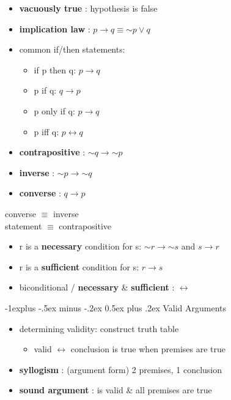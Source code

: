 \documentclass[10pt, landscape]{article}
\makeatletter
\renewcommand{\subsection}{\@startsection{subsection}{2}{0mm}%
                                {-1explus -.5ex minus -.2ex}%
                                {0.5ex plus .2ex}%
                                {\normalfont\normalsize\bfseries}}
\renewcommand{\lnot}{\mathord{\sim}}
\renewcommand{\bf}[1]{\textbf{#1}}
\let\iff\leftrightarrow
\let\then\rightarrow
\makeatother
\begin{document}
\begin{multicols}{4}
\begin{itemize}
    \item \textbf{vacuously true} : hypothesis is false
    \item \textbf{implication law} : $p \then q \equiv \lnot p \lor q$
    \item common if/then statements:
    \begin{itemize}
        \item if p then q: $p \then q$
        \item p if q: $q \then p$
        \item p only if q: $p \then q$
        \item p iff q: $p \iff q$
    \end{itemize}
\end{itemize}

\begin{multicols}{2}
    \begin{itemize}
        \item \bf{contrapositive} : $\lnot q \then \lnot p$ 
        \item \bf{inverse} : $\lnot p \then \lnot q$ 
        \item \bf{converse} : $q \then p$ 
    \end{itemize} 
    \begin{center}
        converse $\equiv$ inverse 
        \\ statement $\equiv$ contrapositive 
    \end{center}
\end{multicols}

\begin{itemize}
    \item r is a \bf{necessary} condition for s: $\lnot r \then \lnot s$ and $s \then r$
    \item r is a \bf{sufficient} condition for s: $r \then s$
    \item biconditional / \bf{necessary} \& \bf{sufficient} : $\iff$
\end{itemize}

\subsection{Valid Arguments}
\begin{itemize}
    \item determining validity: construct truth table
    \begin{itemize}
        \item valid $\iff$ conclusion is true when premises are true
    \end{itemize}
    \item \bf{syllogism} : (argument form) 2 premises, 1 conclusion
    \item \bf{sound argument} : is valid \& all premises are true
\end{itemize}


\end{multicols}
\end{document}

